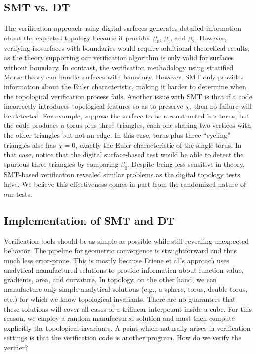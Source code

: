 \subsection{SMT vs. DT}
The verification approach using digital surfaces generates detailed
information about the expected topology because it provides $\beta_0$, $\beta_1$, and $\beta_2$. 
However, verifying isosurfaces with boundaries would require
additional theoretical results, as the theory supporting our verification
algorithm is only valid for surfaces without boundary.
In contrast, the verification methodology using stratified Morse theory can handle
surfaces with boundary. However, SMT only provides information 
about the Euler characteristic, making it harder to determine when the topological verification process fails.
Another issue with SMT is that if a code incorrectly introduces topological features so as
to preserve $\chi$, then no failure will be detected. For example, suppose the surface to
be reconstructed is a torus, but the code produces a torus plus three triangles,
each one sharing two vertices with the other triangles but not an edge. In this case, 
torus plus three ``cycling'' triangles also has $\chi = 0$, exactly the Euler characteristic of the single torus.
In that case, notice that the digital surface-based test would be able to
detect the spurious three triangles by comparing $\beta_0$.
Despite being less sensitive in theory, 
SMT-based verification revealed similar problems as the digital topology tests have. 
We believe this effectiveness comes in part from 
the randomized nature of our tests.

\subsection{Implementation of SMT and DT}
Verification tools should be as simple as possible while still
revealing unexpected behavior. The pipeline for geometric
convergence is straightforward and thus much less error-prone. This is
mostly because
Etiene et al.'s approach uses analytical manufactured solutions to provide
information about function value, gradients, area, and curvature. In topology,
on the other hand, we can manufacture only simple analytical solutions (e.g., a
sphere, torus, double-torus, etc.) for which we know topological
invariants. There are no guarantees that these solutions will cover all
cases of a trilinear interpolant inside a cube. For this reason, we
employ a random manufactured solution and must then compute
explicitly the topological invariants.
A point which naturally arises in verification settings is that the verification code is another program. 
How do we verify the verifier?

